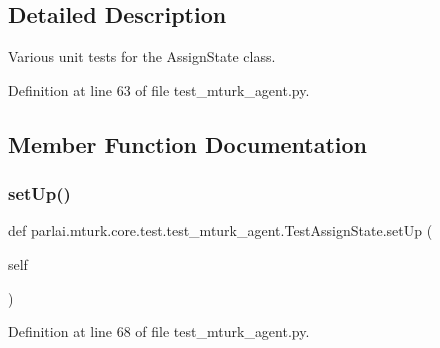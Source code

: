 \subsection{Detailed Description}
\begin{DoxyVerb}Various unit tests for the AssignState class.
\end{DoxyVerb}
 

Definition at line 63 of file test\+\_\+mturk\+\_\+agent.\+py.



\subsection{Member Function Documentation}
\mbox{\label{classparlai_1_1mturk_1_1core_1_1test_1_1test__mturk__agent_1_1TestAssignState_ab007ae6652285eb12ea8868a962e3c24}} 
\subsubsection{\texorpdfstring{set\+Up()}{setUp()}}
{\footnotesize\ttfamily def parlai.\+mturk.\+core.\+test.\+test\+\_\+mturk\+\_\+agent.\+Test\+Assign\+State.\+set\+Up (\begin{DoxyParamCaption}\item[{}]{self }\end{DoxyParamCaption})}



Definition at line 68 of file test\+\_\+mturk\+\_\+agent.\+py.


